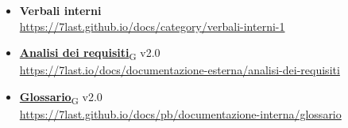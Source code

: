 \begin{itemize}
    \item \textbf{Verbali interni} \\
        \url{https://7last.github.io/docs/category/verbali-interni-1}
    \item \href{https://7last.github.io/docs/pb/documentazione-interna/glossario\#analisi-dei-requisiti}{\textbf{Analisi dei requisiti}\textsubscript{G}} v2.0\\
        \url{https://7last.io/docs/documentazione-esterna/analisi-dei-requisiti}
    \item \href{https://7last.github.io/docs/pb/documentazione-interna/glossario\#glossario}{\textbf{Glossario}\textsubscript{G}} v2.0\\
        \url{https://7last.github.io/docs/pb/documentazione-interna/glossario}
\end{itemize}